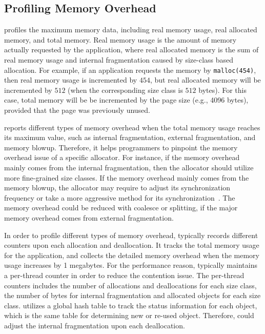 \subsection{Profiling Memory Overhead}
\label{sec:profilingmemory}

\MP{} profiles the maximum memory data, including real memory usage, real allocated memory, and total memory. Real memory usage is the amount of memory actually requested  by the application, where real allocated memory is the sum of real memory usage and internal fragmentation caused by size-class based allocation. For example, if an application requests the memory by \texttt{malloc(454)}, then real memory usage is incremented by $454$, but real allocated memory will be incremented by $512$ (when the corresponding size class is $512$ bytes). For this case, total memory will be  be incremented by the page size (e.g., 4096 bytes), provided that the page was previously unused. 

\MP{} reports different types of memory overhead when the total memory usage reaches its maximum value, such as internal fragmentation, external fragmentation, and memory blowup. 
Therefore, it helps programmers to pinpoint the memory overhead issue of a specific allocator. For instance, if the memory overhead mainly comes from the internal fragmentation, then the allocator should utilize more fine-grained size classes. If the memory overhead mainly comes from the memory blowup, the allocator may require to adjust its synchronization frequency or take a more aggressive method for its synchronization~\cite{DBLP:conf/iwmm/LiLD19}. The memory overhead could be reduced with coalesce or splitting, if the major memory overhead comes from external fragmentation. 

In order to profile different types of memory overhead, \MP{} typically records different counters upon each allocation and deallocation. It tracks the total memory usage for the application, and collects the detailed memory overhead when the memory usage increases by 1 megabytes. For the performance reason, \MP{} typically maintains a per-thread counter in order to reduce the contention issue. The per-thread counters includes the number of allocations and deallocations for each size class, the number of bytes for internal fragmentation  and allocated objects for each size class. 
\MP{} utilizes a global hash table to track the status information for each object, which is the same table for determining new or re-used object. Therefore, \MP{} could adjust the internal fragmentation upon each deallocation. 

